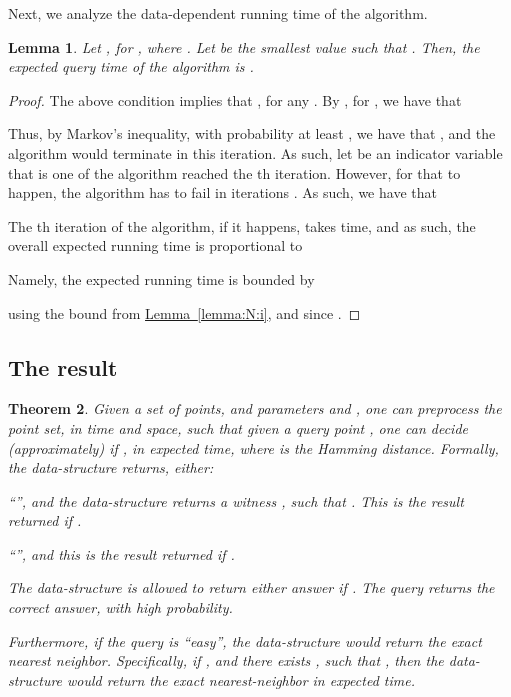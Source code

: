 \documentclass[12pt]{article}\usepackage[cm]{fullpage}
\newtheorem{theorem}{Theorem}[subsection]\newtheorem{lemma}[theorem]{Lemma}\newtheorem{claim}[theorem]{Claim}\newtheorem*{restate*}[theorem]{Restatement of }\newtheorem{corollary}[theorem]{Corollary}
\theoremstyle{remark}\theoremheaderfont{\sf}\theorembodyfont{\upshape}\newtheorem{defn}[theorem]{Definition}
\numberwithin{figure}{section}\numberwithin{table}{section}\numberwithin{equation}{section}
\newcommand{\HLink}[2]{\hyperref[#2]{#1~\ref*{#2}}}
\newcommand{\lemref}[1]{\HLink{Lemma}{lemma:#1}}
\newcommand{\thmlab}[1]{{\label{theo:#1}}}
\renewcommand{\th}{th\xspace}
\begin{document}
Next, we analyze the data-dependent running time of the algorithm.
\begin{lemma}
    Let , for , where
    .  Let
     be the smallest value such that
    . Then, the
    expected query time of the algorithm is
    .
\end{lemma}
\begin{proof}
    The above condition implies that
    , for any .  By
    , for , we have that
    
    Thus, by Markov's inequality, with probability at least
    , we have that , and the
    algorithm would terminate in this iteration.  As such, let 
    be an indicator variable that is one of the algorithm reached the
    \th iteration. However, for that to happen, the algorithm has
    to fail in iterations .  As such,
    we have that
    

    The \th iteration of the algorithm, if it happens, takes
     time, and as such, the overall expected running
    time is proportional to
    
    Namely, the expected running time is bounded by
    
    using the bound  from
    \lemref{N:i}, and since .
\end{proof}

\subsection{The result}

\begin{theorem}
    \thmlab{L:S:H:sensitive}Given a set  of  points,
    and parameters  and , one can preprocess the point
    set, in  time and space, such
    that given a query point , one can decide
    (approximately) if , in
     expected time, where  is
    the Hamming distance. Formally, the data-structure returns,
    either: \smallskip \begin{compactitem}
        \item ``'', and the
        data-structure returns a witness , such that
        . This is the result
        returned if .
        
        \smallskip \item ``'', and this
        is the result returned if
        .
    \end{compactitem}
    \smallskip The data-structure is allowed to return either answer if
    .  The query
    returns the correct answer, with high probability.
    
    Furthermore, if the query is ``easy'', the data-structure would
    return the \emph{exact} nearest neighbor. Specifically, if
    , and there exists
    , such that
    ,
    then the data-structure would return the exact nearest-neighbor in
     expected time.
\end{theorem}
\end{document}

